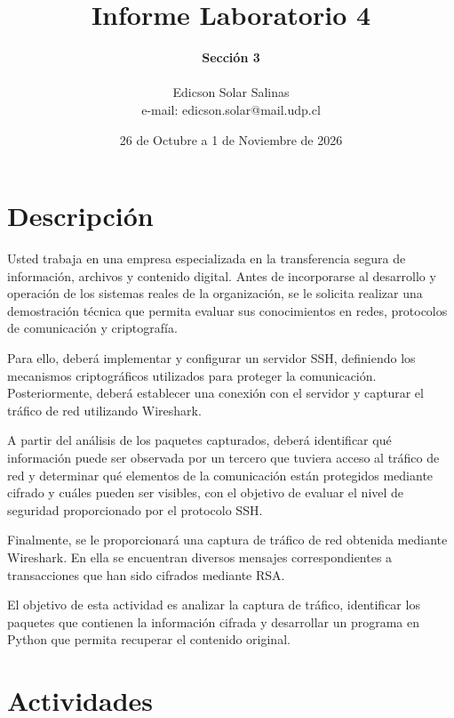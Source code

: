 \documentclass[letter,12pt]{article}
\begin{document}
%
   \title{\Huge{Informe Laboratorio 4}}

   \author{\textbf{Sección 3} \\  \\Edicson Solar Salinas \\ e-mail: edicson.solar@mail.udp.cl}
          
   \date{26 de Octubre a 1 de Noviembre de 2026}

   \maketitle
   
   \begingroup
   \small
   \tableofcontents
   \endgroup
 
  \newpage
  

\section{Descripción}
Usted trabaja en una empresa especializada en la transferencia segura de información, archivos y contenido digital. Antes de incorporarse al desarrollo y operación de los sistemas reales de la organización, se le solicita realizar una demostración técnica que permita evaluar sus conocimientos en redes, protocolos de comunicación y criptografía.

Para ello, deberá implementar y configurar un servidor SSH, definiendo los mecanismos criptográficos utilizados para proteger la comunicación. Posteriormente, deberá establecer una conexión con el servidor y capturar el tráfico de red utilizando Wireshark.

A partir del análisis de los paquetes capturados, deberá identificar qué información puede ser observada por un tercero que tuviera acceso al tráfico de red y determinar qué elementos de la comunicación están protegidos mediante cifrado y cuáles pueden ser visibles, con el objetivo de evaluar el nivel de seguridad proporcionado por el protocolo SSH.

Finalmente, se le proporcionará una captura de tráfico de red obtenida mediante Wireshark. En ella se encuentran diversos mensajes correspondientes a transacciones que han sido cifrados mediante RSA.

El objetivo de esta actividad es analizar la captura de tráfico, identificar los paquetes que contienen la información cifrada y desarrollar un programa en Python que permita recuperar el contenido original.

\section{Actividades}
\end{document}
